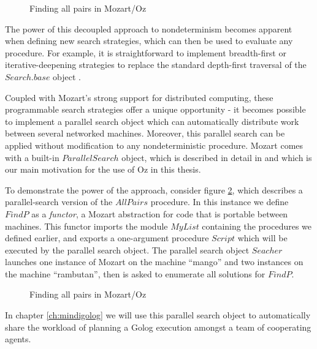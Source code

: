 %
\begin{figure}[t]

\caption{Finding all pairs in Mozart/Oz\label{fig:Background:All-Pairs}}

\end{figure}


The power of this decoupled approach to nondeterminism becomes apparent
when defining new search strategies, which can then be used to evaluate
any procedure. For example, it is straightforward to implement breadth-first
or iterative-deepening strategies to replace the standard depth-first
traversal of the $Search.base$ object \citep{schulte00constraint_services}.

Coupled with Mozart's strong support for distributed computing, these
programmable search strategies offer a unique opportunity - it becomes
possible to implement a parallel search object which can automatically
distribute work between several networked machines. Moreover, this
parallel search can be applied without modification to any nondeterministic
procedure. Mozart comes with a built-in $ParallelSearch$ object,
which is described in detail in \citep{schulte00oz_parallel} and
which is our main motivation for the use of Oz in this thesis.

To demonstrate the power of the approach, consider figure \ref{fig:Background:Parallel-All-Pairs},
which describes a parallel-search version of the $AllPairs$ procedure.
In this instance we define $FindP$ as a \emph{functor}, a Mozart
abstraction for code that is portable between machines. This functor
imports the module $MyList$ containing the procedures we defined
earlier, and exports a one-argument procedure $Script$ which will
be executed by the parallel search object. The parallel search object
$Seacher$ launches one instance of Mozart on the machine {}``mango''
and two instances on the machine {}``rambutan'', then is asked to
enumerate all solutions for $FindP$.

%
\begin{figure}[t]

\caption{Finding all pairs in Mozart/Oz\label{fig:Background:Parallel-All-Pairs}}

\end{figure}


In chapter \ref{ch:mindigolog} we will use this parallel search object
to automatically share the workload of planning a Golog execution
amongst a team of cooperating agents.

